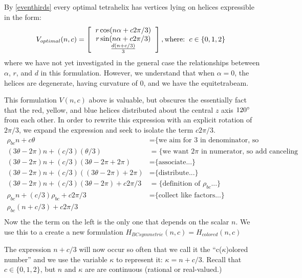 \documentclass[11pt]{article}
\begin{document}
By \ref{eventhirds} every optimal tetrahelix has vertices lying on helices expressible in the form:
\[
V_{optimal}(n,c) =
\left [
  \begin{tabular}{c}
   $ r \cos(n \alpha +  c 2 \pi /3)$\\
   $ r \sin(n \alpha +  c 2 \pi /3) $\\
   $ \frac{d(n +c / 3)}{3}   $
  \end{tabular}
  \right ],
\text{where:}
\begin{tabular}{c}
  $c \in \{0,1,2\}$
  \end{tabular}      
\]
where we have not yet investigated in the general case the relationships beteween $\alpha$, $r$, and $d$ in this formulation.
However, we understand that when $\alpha = 0$, the helices are degenerate, having curvature of $0$, and
we have the equitetrabeam.


This formulation $V(n,c)$ above is valuable, but obscures the essentially fact that the red, yellow, and blue helices distributed
about the central $z$ axis $120\degree$ from each other.
In order to rewrite this expression with an explicit rotation of $2\pi/3$, we expand 
the expression and seek to isolate the term $c2\pi/3$.
\begin{align*}
  \rho_{bc} n + c \theta  &=   \text{\{we aim for 3 in denominator, so we split...\}} \\
    (3 \theta - 2 \pi)n + (c/3)  (\theta /3)  &=   \text{\{we want $2\pi$ in numerator, so add canceling terms...\}} \\
  (3 \theta - 2 \pi)n + (c/ 3) (3 \theta - 2 \pi  + 2 \pi) &=  \text{\{associate...\}} \\
  (3 \theta - 2 \pi)n + (c/ 3) ((3 \theta - 2 \pi)  + 2 \pi) &=  \text{\{distribute...\}} \\  
  (3 \theta - 2 \pi)n + (c / 3) (3 \theta - 2 \pi)  + c 2 \pi /3 &=  \text{\{definition of $\rho_{bc}$...\}} \\
  \rho_{bc} n + (c / 3) \rho_{bc}  + c 2 \pi /3 &=  \text{\{collect like factors...\}} \\  
  \rho_{bc} (n + c/3)  + c 2 \pi /3  \\
\end{align*}
Now the the term on the left is the only one that depends on the scalar $n$. We use this to a create
a new formulation $H_{BCsymmetric}(n,c) = H_{colored}(n,c)$

The expression $n+c/3$ will now occur so often that we call it the ``c($\kappa$)olored number'' and we use the variable $\kappa$ to represent it: $\kappa = n+c/3$.
Recall that $c \in \{0,1,2\}$, but $n$ and $\kappa$ are are continuous (rational or real-valued.)
\end{document}
